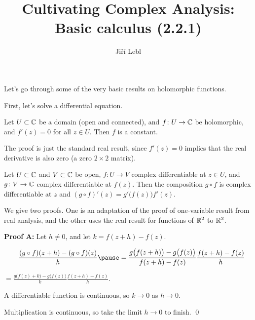 \documentclass[10pt,aspectratio=169]{beamer}
\author{Ji\v{r}\'i Lebl}
\institute[OSU]{%
Departemento pri Matematiko de Oklahoma {\^S}tata Universitato}
\title{Cultivating Complex Analysis:\\%
Basic calculus (2.2.1)}
\date{}
\begin{document}
\begin{frame}
\titlepage
\end{frame}

\begin{frame}
Let's go through some of the very basic results on holomorphic functions.

\medskip
\pause

First, let's solve a differential equation.

\pause

\begin{proposition}
Let $U \subset {\mathbb{C}}$ be a domain (open and connected),
and $f \colon U \to {\mathbb{C}}$ be holomorphic, and $f'(z) = 0$ for all $z \in U$.
Then $f$ is a constant.
\end{proposition}

\pause

The proof is just the standard real result, since $f'(z)=0$ implies that
the real derivative is also zero (a zero $2 \times 2$ matrix).
\end{frame}

\begin{frame}
\begin{proposition}
Let $U \subset {\mathbb{C}}$ and $V \subset {\mathbb{C}}$ be open, $f \colon U \to V$
complex differentiable at $z \in U$, and $g \colon V \to {\mathbb{C}}$ complex differentiable
at $f(z)$.  Then the composition $g \circ f$
is complex differentiable at $z$ and $(g \circ f)'(z) = g'\bigl(f(z)\bigr) f'(z)$.
\end{proposition}

\pause

We give two proofs.  One is an adaptation of the proof of one-variable result
from real analysis, and the other uses the real result for functions of ${\mathbb{R}}^2$
to ${\mathbb{R}}^2$.

\medskip
\pause

\textbf{Proof A:}
Let $h \not= 0$, and let $k = f(z+h) -f(z)$.

\medskip
\pause

$\displaystyle
\qquad
\frac{(g \circ f)(z+h) - (g \circ f)(z)}{h}
\pause
 =
\frac{g \bigl( f(z+h) \bigr) - g\bigl( f(z) \bigr)}{f(z+h)-f(z)}
\frac{f(z+h)-f(z)}{h}
$

\pause
\medskip

%
$\displaystyle
=
\frac{g \bigl( f(z) + k \bigr) - g\bigl( f(z) \bigr)}{k}
\frac{f(z+h)-f(z)}{h} .
$

\medskip
\pause

A differentiable function is continuous, so $k \to 0$ as $h \to 0$.
\pause

Multiplication is continuous, so take the limit $h \to 0$ to finish.
\qed

\end{frame}
\end{document}
